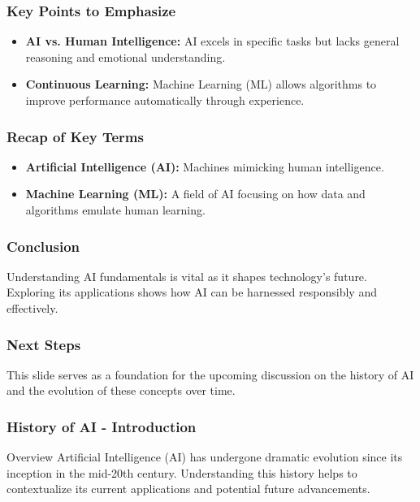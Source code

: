 \documentclass[aspectratio=169]{beamer}
\begin{document}
\begin{frame}[fragile]
    \frametitle{Key Points to Emphasize}
    \begin{itemize}
        \item \textbf{AI vs. Human Intelligence:} AI excels in specific tasks but lacks general reasoning and emotional understanding.
        \item \textbf{Continuous Learning:} Machine Learning (ML) allows algorithms to improve performance automatically through experience.
    \end{itemize}
\end{frame}

\begin{frame}[fragile]
    \frametitle{Recap of Key Terms}
    \begin{itemize}
        \item \textbf{Artificial Intelligence (AI):} Machines mimicking human intelligence.
        \item \textbf{Machine Learning (ML):} A field of AI focusing on how data and algorithms emulate human learning.
    \end{itemize}
\end{frame}

\begin{frame}[fragile]
    \frametitle{Conclusion}
    Understanding AI fundamentals is vital as it shapes technology's future. Exploring its applications shows how AI can be harnessed responsibly and effectively.
\end{frame}

\begin{frame}[fragile]
    \frametitle{Next Steps}
    This slide serves as a foundation for the upcoming discussion on the history of AI and the evolution of these concepts over time.
\end{frame}

\begin{frame}[fragile]
    \frametitle{History of AI - Introduction}
    \begin{block}{Overview}
        Artificial Intelligence (AI) has undergone dramatic evolution since its inception in the mid-20th century. 
        Understanding this history helps to contextualize its current applications and potential future advancements.
    \end{block}
\end{frame}
\end{document}
